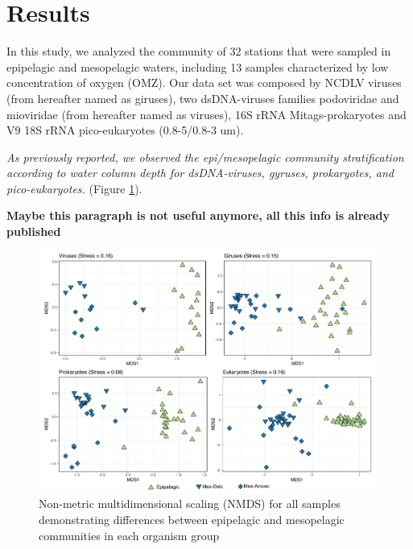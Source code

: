 \documentclass[fleqn,10pt]{wlscirep}
\begin{document}
\section*{Results}

In this study, we analyzed the community of 32 stations that were sampled in epipelagic and mesopelagic waters, including 13 samples characterized by low concentration of oxygen (OMZ). Our data set was composed by NCDLV viruses (from hereafter named as giruses), two dsDNA-viruses families podoviridae and mioviridae (from hereafter named as viruses), 16S rRNA Mitags-prokaryotes and V9 18S rRNA pico-eukaryotes (0.8-5/0.8-3 um).

\textit{As previously reported, we observed the epi/mesopelagic community stratification according to water column depth for dsDNA-viruses, gyruses, prokaryotes, and pico-eukaryotes.}  (Figure \ref{fig:nmds}).


\textbf{Maybe this paragraph is not useful anymore, all this info is already published}


\begin{figure}[ht]
    \centering
    \includegraphics[scale=0.5]{images/nmds_used_SF_to_print.pdf}
    \caption{Non-metric multidimensional scaling (NMDS) for all samples demonstrating differences between epipelagic and mesopelagic communities in each organism group}
    \label{fig:nmds}
\end{figure}
\end{document}
